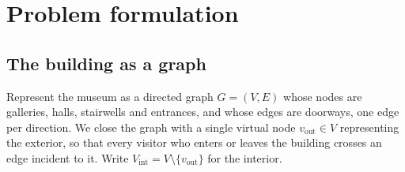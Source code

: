 \documentclass[11pt]{article}
\theoremstyle{plain}
\theoremstyle{definition}
\theoremstyle{remark}
\begin{document}
\section{Problem formulation}
\label{sec:formulation}

\subsection{The building as a graph}

Represent the museum as a directed graph $G=(V,E)$ whose nodes are galleries, halls, stairwells and entrances, and whose edges are doorways, one edge per direction. We close the graph with a single virtual node $v_{\mathrm{out}} \in V$ representing the exterior, so that every visitor who enters or leaves the building crosses an edge incident to it. Write $V_{\mathrm{int}} = V \setminus \{v_{\mathrm{out}}\}$ for the interior.
\end{document}
